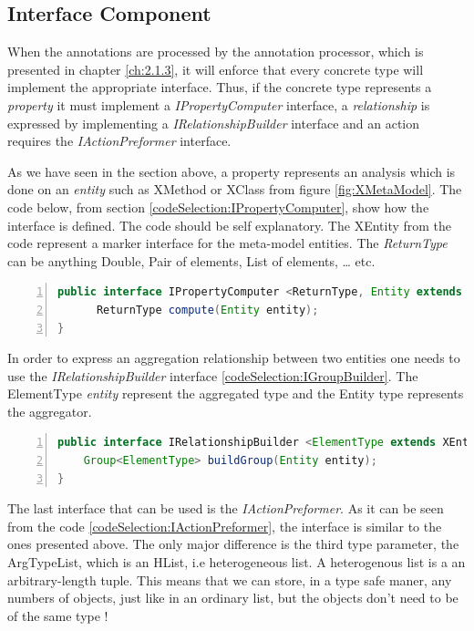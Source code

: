 \subsection{Interface Component}\label{ch:2.1.2}
        
        When the annotations are processed by the annotation processor, which is presented in chapter \ref{ch:2.1.3}, it will enforce that every concrete type will implement the appropriate
interface. Thus, if the concrete type represents a \textit{property} it must implement a \textit{IPropertyComputer} interface, a \textit{relationship} is expressed by implementing a 
\textit{IRelationshipBuilder} interface and an action requires the \textit{IActionPreformer} interface.

        As we have seen in the section above, a property represents an analysis which is done on an \textit{entity} such as XMethod or XClass from figure \ref{fig:XMetaModel}. The code below, 
from section \ref{codeSelection:IPropertyComputer}, show how the interface is defined. The code should be self explanatory. The XEntity from the code represent a marker interface for the meta-model entities.
The \textit{ReturnType} can be anything Double, Pair of elements, List of elements, \ldots{} etc.
        
\small
\begin{lstlisting}[language=Java,numbers=left]
 public interface IPropertyComputer <ReturnType, Entity extends XEntity> {
      ReturnType compute(Entity entity);
}   
\end{lstlisting}
\normalsize{} \label{codeSelection:IPropertyComputer}

        In order to express an aggregation relationship between two entities one needs to use the \textit{IRelationshipBuilder} interface \ref{codeSelection:IGroupBuilder}. 
The ElementType \textit{entity} represent the aggregated type and the Entity type represents the aggregator.

\small
\begin{lstlisting}[language=Java,numbers=left]
public interface IRelationshipBuilder <ElementType extends XEntity, Entity extends XEntity> {
    Group<ElementType> buildGroup(Entity entity);
}
\end{lstlisting}
\normalsize{} \label{codeSelection:IGroupBuilder}

        The last interface that can be used is the \textit{IActionPreformer}. As it can be seen from the code \ref{codeSelection:IActionPreformer}, the interface is similar
to the ones presented above. The only major difference is the third type parameter, the ArgTypeList, which is an HList, i.e heterogeneous list. A heterogenous list is a an
arbitrary-length tuple. This means that we can store, in a type safe maner, any numbers of objects, just like in an ordinary list, but the objects don't need to be of the 
same type !

